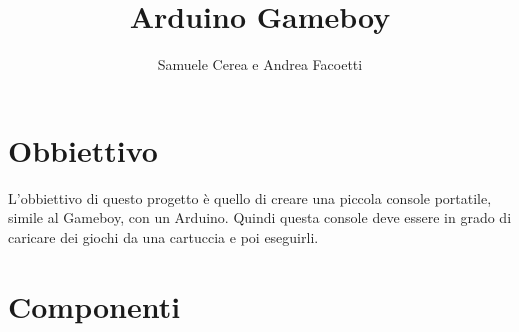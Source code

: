 \documentclass[a4paper,12pt]{article}
\title{Arduino Gameboy}
\author{Samuele Cerea e Andrea Facoetti}
\begin{document}
\maketitle
{} %

\section{Obbiettivo}
L'obbiettivo di questo progetto \`e quello di creare una piccola console
portatile, simile al Gameboy, con un Arduino. Quindi questa console deve essere
in grado di caricare dei giochi da una cartuccia e poi eseguirli.

\section{Componenti}
\end{document}
